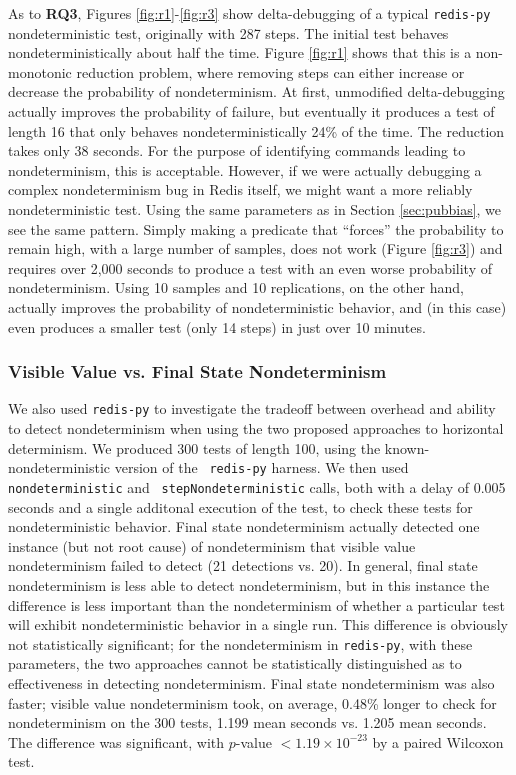 {As to {\bf RQ3}, Figures \ref{fig:r1}-\ref{fig:r3} show delta-debugging of a typical
{\tt redis-py} nondeterministic test, originally with 287 steps.  The initial test behaves
nondeterministically about half the time.  Figure \ref{fig:r1} shows
that this is a non-monotonic reduction problem, where removing steps
can either increase or decrease the probability of nondeterminism.  At
first, unmodified delta-debugging actually improves the probability of
failure, but eventually it produces a test of length 16 that only behaves
nondeterministically 24\% of the time.  The reduction takes only 38
seconds.  For the purpose of identifying commands leading to
nondeterminism, this is acceptable.  However, if we were actually
debugging a complex nondeterminism bug in Redis itself, we might want
a more reliably nondeterministic test.  Using the same parameters as
in Section \ref{sec:pubbias}, we see the same pattern.  Simply making
a predicate that ``forces'' the probability to remain high, with a
large number of samples, does not work (Figure \ref{fig:r3}) and
requires over 2,000 seconds to produce a test with an even worse
probability of nondeterminism.  Using 10 samples and 10 replications,
on the other hand, actually improves the probability of
nondeterministic behavior, and (in this case) even produces a smaller test (only 14 steps) in just
over 10 minutes.

\subsubsection{Visible Value vs. Final State Nondeterminism}

We also used {\tt redis-py} to investigate the tradeoff between
overhead and ability to detect nondeterminism when using the two
proposed approaches to horizontal determinism.  We produced 300 tests
of length 100, using the known-nondeterministic version of the {\tt
  redis-py} harness.  We then used {\tt nondeterministic} and {\tt
  stepNondeterministic} calls, both with a delay of 0.005 seconds and
a single additonal execution of the test, to
check these tests for nondeterministic behavior.  Final state
nondeterminism actually detected one instance (but not root cause) of nondeterminism that
visible value nondeterminism failed to detect (21 detections
vs. 20). In general, final state
nondeterminism is less able to detect nondeterminism, but in this
instance the difference is less important than the nondeterminism of
whether a particular test will exhibit nondeterministic behavior in a
single run.  This difference is obviously not statistically
significant; for the nondeterminism in {\tt redis-py}, with these
parameters, the two approaches cannot be statistically distinguished
as to effectiveness in detecting nondeterminism.
Final state nondeterminism was also faster; visible value
nondeterminism took, on average, 0.48\% longer to check for
nondeterminism on the 300 tests, 1.199 mean seconds vs. 1.205 mean seconds.  The difference was significant, with
$p$-value $< 1.19 \times 10^{-23}$ by a paired Wilcoxon test.

}
